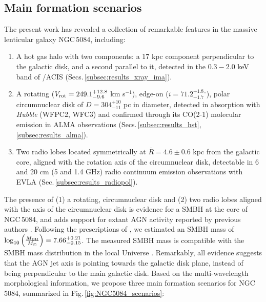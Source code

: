 \documentclass[modern]{CORE-AAS/aastex631}
\begin{document}
\subsection{Main formation scenarios}
\label{subsec:discussion_main_formation_scenarios}
The present work has revealed a collection of remarkable features in the massive lenticular galaxy NGC\,5084, including: 
\begin{enumerate}

    \item A hot gas halo with two components: a 17 kpc component perpendicular to the galactic disk, and a second parallel to it, detected in the $0.3-2.0$ keV band of \Chandra/ACIS (Secs.\,\ref{subsec:results_xray_ima}). 

    \item A rotating ($V_{\rm rot} = 249.1^{+12.8}_{-9.6}$ km s$^{-1}$), edge-on ($i=71.2^{+1.8}_{-1.7}$$^{\circ}$), polar circumnuclear disk of $D=304^{+10}_{-11}$ pc in diameter, detected in absorption with \emph{Hubble} (WFPC2, WFC3) and confirmed through its CO(2-1) molecular emission in ALMA  observations (Secs.\,\ref{subsec:results_hst}, \,\ref{subsec:results_alma}).
    
    \item Two radio lobes located symmetrically at $\overline{R}=4.6\pm0.6$ kpc from the galactic core, aligned with the rotation axis of the circumnuclear disk, detectable in 6 and 20 cm (5 and 1.4 GHz) radio continuum emission observations with EVLA (Sec.\,\ref{subsec:results_radiopol}).  
    
    
\end{enumerate}

The presence of (1) a rotating, circumnuclear disk and (2) two radio lobes aligned with the axis of the circumnuclear disk is evidence for a SMBH at the core of NGC\,5084, and adds support for extant AGN activity reported by previous authors \citep{kewley+2001apj556_121}. Following the prescriptions of \citet{smith+2021mnras500_1933}, we estimated an SMBH mass of $\log_{10}\left( \frac{M_{\rm BH}}{M_{\odot}} \right) = 7.66^{+0.21}_{-0.15}$. The measured SMBH mass is compatible with the SMBH mass distribution in the local Universe \citep{vika+2009mnras400_1451, smith+2021mnras500_1933}. Remarkably, all evidence suggests that the AGN jet axis is pointing towards the galactic disk plane, instead of being perpendicular to the main galactic disk. Based on the multi-wavelength morphological information, we propose three main formation scenarios for NGC\,5084, summarized in Fig.\,\ref{fig:NGC5084_scenarios}:
\end{document}
